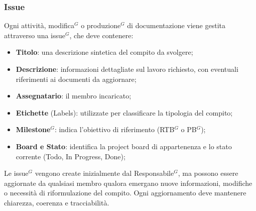 \subsubsection{Issue}
Ogni attività, modifica$^G$ o produzione$^G$ di documentazione viene gestita attraverso una issue$^G$, che deve contenere:
\begin{itemize}[itemsep=3pt, parsep=1pt, label=$\scriptstyle\bullet$]
    \item \textbf{Titolo}: una descrizione sintetica del compito da svolgere;
    \item \textbf{Descrizione}: informazioni dettagliate sul lavoro richiesto, con eventuali riferimenti ai documenti da aggiornare;
    \item \textbf{Assegnatario}: il membro incaricato;
    \item \textbf{Etichette} (Labels): utilizzate per classificare la tipologia del compito;
    \item \textbf{Milestone$^G$}: indica l’obiettivo di riferimento (RTB$^G$ o PB$^G$);
    \item \textbf{Board e Stato}: identifica la project board di appartenenza e lo stato corrente (Todo, In Progress, Done);
\end{itemize}
Le issue$^G$ vengono create inizialmente dal Responsabile$^G$, ma possono essere aggiornate da qualsiasi membro qualora emergano nuove informazioni, modifiche o necessità di riformulazione del compito. Ogni aggiornamento deve mantenere chiarezza, coerenza e tracciabilità.\\

